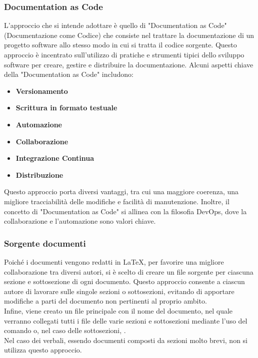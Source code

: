 \subsubsection{Documentation as Code}\label{sec:DocumentationAscode}
L'approccio che si intende adottare è quello di "Documentation as Code" (Documentazione come Codice) che consiste nel trattare la documentazione di un progetto software allo stesso modo in cui si tratta il codice sorgente. Questo approccio è incentrato sull'utilizzo di pratiche e strumenti tipici dello sviluppo software per creare, gestire e distribuire la documentazione.
Alcuni aspetti chiave della "Documentation as Code" includono:
\begin{itemize}
    \item \textbf{Versionamento}
    \item \textbf{Scrittura in formato testuale}
    \item \textbf{Automazione}
    \item \textbf{Collaborazione}
    \item \textbf{Integrazione Continua}
    \item \textbf{Distribuzione}
\end{itemize}
Questo approccio porta diversi vantaggi, tra cui una maggiore coerenza, una migliore tracciabilità delle modifiche e facilità di manutenzione. Inoltre, il concetto di "Documentation as Code" si allinea con la filosofia DevOps, dove la collaborazione e l'automazione sono valori chiave.\\

\subsubsection{Sorgente documenti}
Poiché i documenti vengono redatti in \LaTeX, per favorire una migliore collaborazione tra diversi autori, si è scelto di creare un file sorgente per ciascuna sezione e sottosezione di ogni documento. Questo approccio consente a ciascun autore di lavorare sulle singole sezioni o sottosezioni, evitando di apportare modifiche a parti del documento non pertinenti al proprio ambito. \\
Infine, viene creato un file principale con il nome del documento, nel quale verranno collegati tutti i file delle varie sezioni e sottosezioni mediante l'uso del comando \verb|| o, nel caso delle sottosezioni, \verb||. \\
Nel caso dei verbali, essendo documenti composti da sezioni molto brevi, non si utilizza questo approccio.

